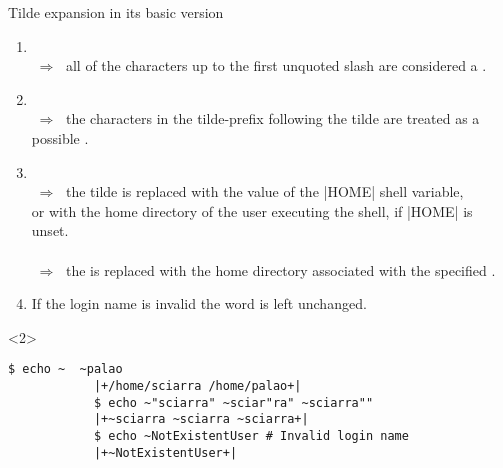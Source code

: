 \begin{frame}[fragile]{Tilde expansion in its basic version}
    \vspace{-2mm}
    \begin{enumerate}
        \small
        \item {}\\
              $\;\Rightarrow\;$ all of the characters up to the first unquoted slash are considered a \textbf{}.\\
              \phantom{$\;\Rightarrow\;$} 
        \item {}\\
              $\;\Rightarrow\;$ the characters in the tilde-prefix following the tilde are treated as a possible \textbf{}.
        \item {}\\
              $\;\Rightarrow\;$ the tilde is replaced with the value of the \bash|HOME| shell variable,\\
              \phantom{$\;\Rightarrow\;$} or with the home directory of the user executing the shell, if \bash|HOME| is unset.\\
              \\
              $\;\Rightarrow\;$ the \textbf{} is replaced with the home directory associated with the specified \textbf{}.
        \item \alert{If the login name is invalid the word is left unchanged.}
    \end{enumerate}
    \begin{uncoverenv}<2>
        \begin{lstlisting}[style=MyBash, style=oddnumbers, aboveskip=4mm]
            $ echo ~  ~palao
            |+/home/sciarra /home/palao+|
            $ echo ~"sciarra" ~sciar"ra" ~sciarra""
            |+~sciarra ~sciarra ~sciarra+|
            $ echo ~NotExistentUser # Invalid login name
            |+~NotExistentUser+|
        \end{lstlisting}
    \end{uncoverenv}
\end{frame}
